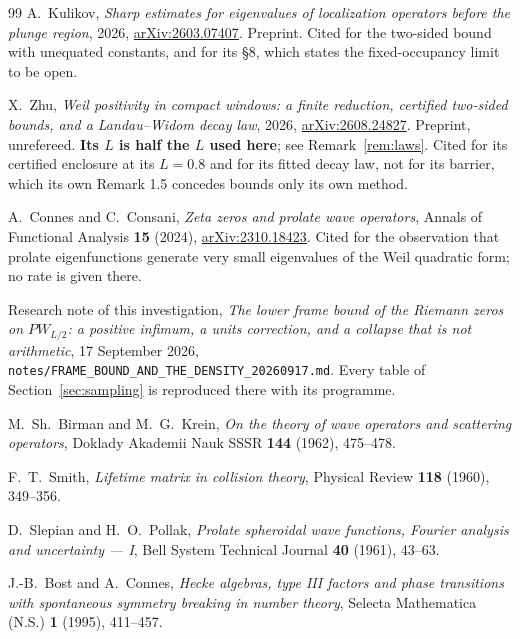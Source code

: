 \begin{thebibliography}{99}
A.~Kulikov, \emph{Sharp estimates for eigenvalues of localization operators
before the plunge region}, 2026,
\href{https://arxiv.org/abs/2603.07407}{arXiv:2603.07407}. Preprint. Cited for
the two-sided bound with unequated constants, and for its \S8, which states the
fixed-occupancy limit to be open.

X.~Zhu, \emph{Weil positivity in compact windows: a finite reduction, certified
two-sided bounds, and a Landau--Widom decay law}, 2026,
\href{https://arxiv.org/abs/2608.24827}{arXiv:2608.24827}. Preprint,
unrefereed. \textbf{Its $L$ is half the $L$ used here}; see
Remark~\ref{rem:laws}. Cited for its certified enclosure at its $L=0.8$ and for
its fitted decay law, not for its barrier, which its own Remark 1.5 concedes
bounds only its own method.

A.~Connes and C.~Consani, \emph{Zeta zeros and prolate wave operators}, Annals of
Functional Analysis \textbf{15} (2024),
\href{https://arxiv.org/abs/2310.18423}{arXiv:2310.18423}. Cited for the
observation that prolate eigenfunctions generate very small eigenvalues of the
Weil quadratic form; no rate is given there.

Research note of this investigation, \emph{The lower frame bound of the Riemann
zeros on $PW_{L/2}$: a positive infimum, a units correction, and a collapse that
is not arithmetic}, 17 September 2026,
\texttt{notes/FRAME\_BOUND\_AND\_THE\_DENSITY\_20260917.md}. Every table of
Section~\ref{sec:sampling} is reproduced there with its programme.

M.~Sh.~Birman and M.~G.~Krein, \emph{On the theory of wave operators and
scattering operators}, Doklady Akademii Nauk SSSR \textbf{144} (1962), 475--478.

F.~T.~Smith, \emph{Lifetime matrix in collision theory}, Physical Review
\textbf{118} (1960), 349--356.

D.~Slepian and H.~O.~Pollak, \emph{Prolate spheroidal wave functions, Fourier
analysis and uncertainty --- I}, Bell System Technical Journal \textbf{40}
(1961), 43--63.

J.-B.~Bost and A.~Connes, \emph{Hecke algebras, type III factors and phase
transitions with spontaneous symmetry breaking in number theory}, Selecta
Mathematica (N.S.) \textbf{1} (1995), 411--457.
\end{thebibliography}
